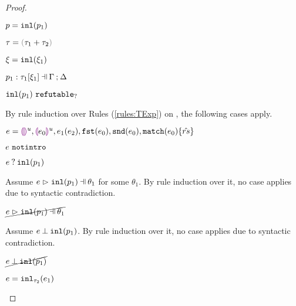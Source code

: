\begin{proof}
\begin{byCases}
\begin{pfsteps*}
    \item $p=\mathtt{inl}(p_1)$ 
    \item $\tau=\tsum{\tau_1}{\tau_2}$ 
    \item $\xi=\mathtt{inl}(\xi_1)$ 
    \item $\chpattyp{p_1}{\tau_1}{\xi_1}{\Gamma}{\Delta}$  
    \item $\mathtt{inl}(p_1) ~\mathtt{refutable}_?$  
    \end{pfsteps*}
    By rule induction over Rules (\ref{rules:TExp}) on , the following cases apply.
    \begin{byCases}
    \item[\text{(\ref{rule:TEHole}),(\ref{rule:THole}),(\ref{rule:TAp}),(\ref{rule:TFst}),(\ref{rule:TSnd}),(\ref{rule:TMatchZPre}),(\ref{rule:TMatchNZPre})}]
        \begin{pfsteps*}
        \item $e=\textcolor{violet}{\llparenthesis}\textcolor{violet}{\rrparenthesis}^{u},\textcolor{violet}{\llparenthesis} e_0\textcolor{violet}{\rrparenthesis}^{u},e_1(e_2),\mathtt{fst}(e_0),\mathtt{snd}(e_0),\mathtt{match}(e_0) \{\hat{rs}\}$ 
        \item $e ~\mathtt{notintro}$  
        \item $e \mathbin{?} \mathtt{inl}(p_1)$ 
        \end{pfsteps*}
        Assume $\hpatmatch{e}{\hinlp{p_1}}{\theta_1}$ for some $\theta_1$. By rule induction over it, no case applies due to syntactic contradiction.
        \begin{pfsteps*}
        \item $\cancel{\hpatmatch{e}{\hinlp{p_1}}{\theta_1}}$ 
        \end{pfsteps*}
        Assume $e \mathbin{\bot} \mathtt{inl}(p_1)$. By rule induction over it, no case applies due to syntactic contradiction.
        \begin{pfsteps*}
        \item $\cancel{e \mathbin{\bot} \mathtt{inl}(p_1)}$ 
        \end{pfsteps*}
    \item[\text{(\ref{rule:TInl})}]
        \begin{pfsteps*}
        \item $e=\mathtt{inl}_{\tau_2}({e_1})$ 

\end{pfsteps*}
\end{byCases}
\end{byCases}
\end{proof}
